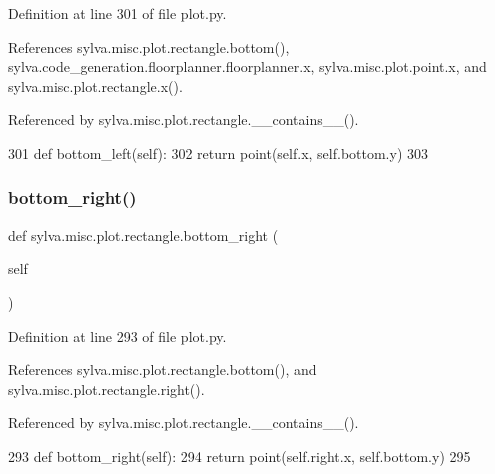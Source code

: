 Definition at line 301 of file plot.\+py.



References sylva.\+misc.\+plot.\+rectangle.\+bottom(), sylva.\+code\+\_\+generation.\+floorplanner.\+floorplanner.\+x, sylva.\+misc.\+plot.\+point.\+x, and sylva.\+misc.\+plot.\+rectangle.\+x().



Referenced by sylva.\+misc.\+plot.\+rectangle.\+\_\+\+\_\+contains\+\_\+\+\_\+().


\begin{DoxyCode}
301     \textcolor{keyword}{def }bottom\_left(self):
302       \textcolor{keywordflow}{return} point(self.x, self.bottom.y)
303 
\end{DoxyCode}
\mbox{\label{classsylva_1_1misc_1_1plot_1_1rectangle_a657018c2fcbc892047da2f18166aae85}} 
\subsubsection{\texorpdfstring{bottom\+\_\+right()}{bottom\_right()}}
{\footnotesize\ttfamily def sylva.\+misc.\+plot.\+rectangle.\+bottom\+\_\+right (\begin{DoxyParamCaption}\item[{}]{self }\end{DoxyParamCaption})}



Definition at line 293 of file plot.\+py.



References sylva.\+misc.\+plot.\+rectangle.\+bottom(), and sylva.\+misc.\+plot.\+rectangle.\+right().



Referenced by sylva.\+misc.\+plot.\+rectangle.\+\_\+\+\_\+contains\+\_\+\+\_\+().


\begin{DoxyCode}
293     \textcolor{keyword}{def }bottom\_right(self):
294       \textcolor{keywordflow}{return} point(self.right.x, self.bottom.y)
295 
\end{DoxyCode}
\mbox{\label{classsylva_1_1misc_1_1plot_1_1rectangle_a0466258315b096cd7f4e1918a1007488}} 
